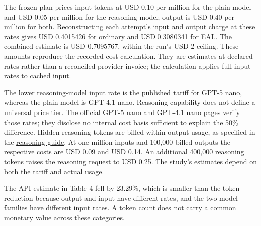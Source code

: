 \documentclass[
  11pt,
]{article}
\begin{document}
The frozen plan prices input tokens at USD 0.10 per million for the
plain model and USD 0.05 per million for the reasoning model; output is
USD 0.40 per million for both. Reconstructing each attempt's input and
output charge at these rates gives USD 0.4015426 for ordinary and USD
0.3080341 for EAL. The combined estimate is USD 0.7095767, within the
run's USD 2 ceiling. These amounts reproduce the recorded cost
calculation. They are estimates at declared rates rather than a
reconciled provider invoice; the calculation applies full input rates to
cached input.

The lower reasoning-model input rate is the published tariff for GPT-5
nano, whereas the plain model is GPT-4.1 nano. Reasoning capability does
not define a universal price tier. The
\href{https://developers.openai.com/api/docs/models/gpt-5-nano}{official
GPT-5 nano} and
\href{https://developers.openai.com/api/docs/models/gpt-4.1-nano}{GPT-4.1
nano} pages verify those rates; they disclose no internal cost basis
sufficient to explain the 50\% difference. Hidden reasoning tokens are
billed within output usage, as specified in the
\href{https://developers.openai.com/api/docs/guides/reasoning}{reasoning
guide}. At one million inputs and 100,000 billed outputs the respective
costs are USD 0.09 and USD 0.14. An additional 400,000 reasoning tokens
raises the reasoning request to USD 0.25. The study's estimates depend
on both the tariff and actual usage.

The API estimate in Table 4 fell by 23.29\%, which is smaller than the
token reduction because output and input have different rates, and the
two model families have different input rates. A token count does not
carry a common monetary value across these categories.
\end{document}
